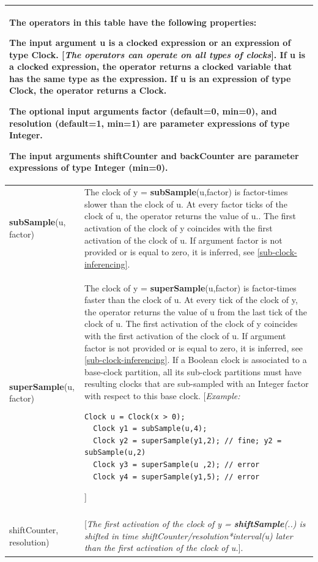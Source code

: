 \documentclass[10pt,a4paper]{report}
\begin{document}
\begin{longtable}[]{|p{4cm}|p{11cm}|}
\hline \endhead
\multicolumn{2}{|p{15cm}|}{
The operators in this table have the following properties:

The input argument u is a clocked expression or an expression of type
Clock. {[}\emph{The operators can operate on all types of clocks}{]}. If
u is a clocked expression, the operator returns a clocked variable that
has the same type as the expression. If u is an expression of type
Clock, the operator returns a Clock.

The optional input arguments factor (default=0, min=0), and resolution
(default=1, min=1) are parameter expressions of type Integer.

The input arguments shiftCounter and backCounter are parameter
expressions of type Integer (min=0).}
\\ \hline
\textbf{subSample}(u, factor)
&
The clock of y = \textbf{subSample}(u,factor) is factor-times slower
than the clock of u. At every factor ticks of the clock of u, the
operator returns the value of u.. The first activation of the clock of y
coincides with the first activation of the clock of u. If argument
factor is not provided or is equal to zero, it is inferred, see 
\ref{sub-clock-inferencing}.
\\ \hline
\textbf{superSample}(u, factor)
&
The clock of y = \textbf{superSample}(u,factor) is factor-times faster
than the clock of u. At every tick of the clock of y, the operator
returns the value of u from the last tick of the clock of u. The first
activation of the clock of y coincides with the first activation of the
clock of u. If argument factor is not provided or is equal to zero, it
is inferred, see \ref{sub-clock-inferencing}. If a Boolean clock is associated to a
base-clock partition, all its sub-clock partitions must have resulting
clocks that are sub-sampled with an Integer factor with respect to this
base clock.
{[}\emph{Example:}
\begin{lstlisting}[language=modelica]
  Clock u = Clock(x > 0);
  Clock y1 = subSample(u,4);
  Clock y2 = superSample(y1,2); // fine; y2 =  subSample(u,2)
  Clock y3 = superSample(u ,2); // error
  Clock y4 = superSample(y1,5); // error
\end{lstlisting}
  {]}\\ \hline
\begin{tabular}{@{}p{4cm}@{}}
\textbf{shiftSample}(u,\\
shiftCounter, resolution)
\end{tabular}
& {[}\emph{The first activation of the clock of y =
\textbf{shiftSample}(..) is shifted in time
shiftCounter/resolution*interval(u) later than the first activation of
the clock of u.}{]}.


\end{longtable}
\end{document}
